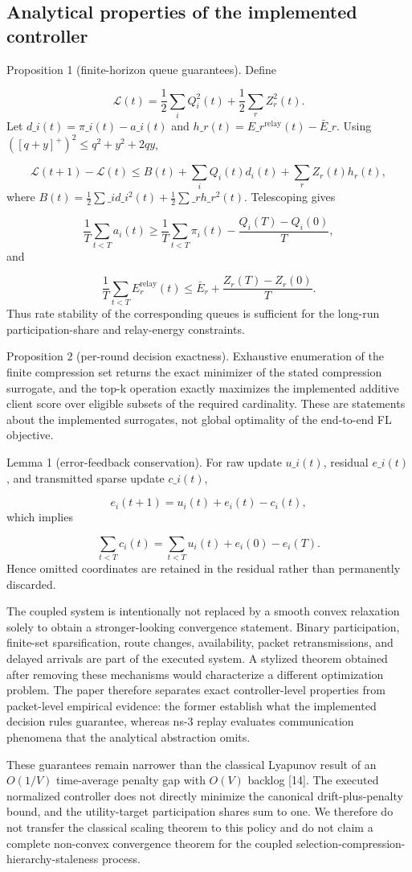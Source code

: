\documentclass[11pt]{article}
\begin{document}
\subsection*{Analytical properties of the implemented controller}
Proposition 1 (finite-horizon queue guarantees). Define\par
\[
\mathcal L(t)=\frac12\sum_iQ_i^2(t)+\frac12\sum_rZ_r^2(t).
\]
Let \(d\_i(t)=\pi\_i(t)-a\_i(t)\) and \(h\_r(t)=E\_r^{\mathrm{relay}}(t)-\bar E\_r\). Using \(([q+y]^+)^2\le q^2+y^2+2qy\),\par
\[
\mathcal L(t+1)-\mathcal L(t) \le B(t)+\sum_iQ_i(t)d_i(t)+\sum_rZ_r(t)h_r(t),
\]
where \(B(t)=\frac12\sum\_i d\_i^2(t)+\frac12\sum\_r h\_r^2(t)\). Telescoping gives\par
\[
\frac1T\sum_{t<T}a_i(t) \ge \frac1T\sum_{t<T}\pi_i(t) - \frac{Q_i(T)-Q_i(0)}{T},
\]
and\par
\[
\frac1T\sum_{t<T}E_r^{\mathrm{relay}}(t) \le \bar E_r+ \frac{Z_r(T)-Z_r(0)}{T}.
\]
Thus rate stability of the corresponding queues is sufficient for the long-run participation-share and relay-energy constraints.\par
Proposition 2 (per-round decision exactness). Exhaustive enumeration of the finite compression set returns the exact minimizer of the stated compression surrogate, and the top-k operation exactly maximizes the implemented additive client score over eligible subsets of the required cardinality. These are statements about the implemented surrogates, not global optimality of the end-to-end FL objective.\par
Lemma 1 (error-feedback conservation). For raw update \(u\_i(t)\), residual \(e\_i(t)\), and transmitted sparse update \(c\_i(t)\),\par
\[
e_i(t+1)=u_i(t)+e_i(t)-c_i(t),
\]
which implies\par
\[
\sum_{t<T}c_i(t)=\sum_{t<T}u_i(t)+e_i(0)-e_i(T).
\]
Hence omitted coordinates are retained in the residual rather than permanently discarded.\par
The coupled system is intentionally not replaced by a smooth convex relaxation solely to obtain a stronger-looking convergence statement. Binary participation, finite-set sparsification, route changes, availability, packet retransmissions, and delayed arrivals are part of the executed system. A stylized theorem obtained after removing these mechanisms would characterize a different optimization problem. The paper therefore separates exact controller-level properties from packet-level empirical evidence: the former establish what the implemented decision rules guarantee, whereas ns-3 replay evaluates communication phenomena that the analytical abstraction omits.\par
These guarantees remain narrower than the classical Lyapunov result of an \(O(1/V)\) time-average penalty gap with \(O(V)\) backlog [14]. The executed normalized controller does not directly minimize the canonical drift-plus-penalty bound, and the utility-target participation shares sum to one. We therefore do not transfer the classical scaling theorem to this policy and do not claim a complete non-convex convergence theorem for the coupled selection-compression-hierarchy-staleness process.\par
\end{document}
